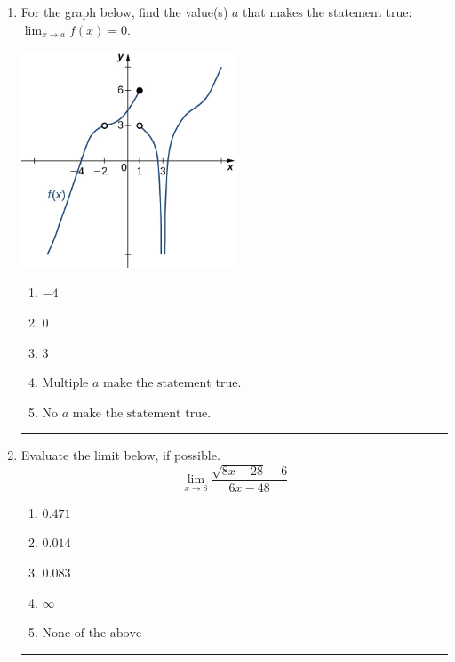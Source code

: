 \documentclass[14pt]{extbook}
\newcommand{\litem}[1]{\item#1\hspace*{-1cm}\rule{\textwidth}{0.4pt}}
\begin{document}
\begin{enumerate}
{\begin{enumerate}[label=\Alph*.]
\end{enumerate} }
\litem{
For the graph below, find the value(s) $a$ that makes the statement true: $ \displaystyle \lim_{x \rightarrow a} f(x) = 0$.
\begin{center}
    \includegraphics[width=0.5\textwidth]{../Figures/evaluateLimitGraphicallyCopyB.png}
\end{center}
\begin{enumerate}[label=\Alph*.]
\item \( -4 \)
\item \( 0 \)
\item \( 3 \)
\item \( \text{Multiple } a \text{ make the statement true}. \)
\item \( \text{No } a \text{ make the statement true}. \)

\end{enumerate} }
\litem{
Evaluate the limit below, if possible.\[ \lim_{x \rightarrow 8} \frac{\sqrt{8x - 28} - 6}{6x - 48} \]\begin{enumerate}[label=\Alph*.]
\item \( 0.471 \)
\item \( 0.014 \)
\item \( 0.083 \)
\item \( \infty \)
\item \( \text{None of the above} \)


\end{enumerate}}
\end{enumerate}
\end{document}
